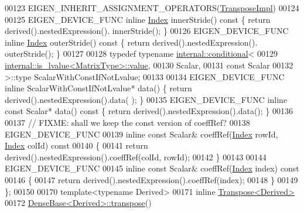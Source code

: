 \begin{DoxyCode}
00123     EIGEN\_INHERIT\_ASSIGNMENT\_OPERATORS(\hyperlink{class_eigen_1_1_transpose_impl}{TransposeImpl})
00124 
00125     EIGEN\_DEVICE\_FUNC \textcolor{keyword}{inline} \hyperlink{namespace_eigen_a62e77e0933482dafde8fe197d9a2cfde}{Index} innerStride()\textcolor{keyword}{ const }\{ \textcolor{keywordflow}{return} derived().nestedExpression().
      innerStride(); \}
00126     EIGEN\_DEVICE\_FUNC \textcolor{keyword}{inline} \hyperlink{namespace_eigen_a62e77e0933482dafde8fe197d9a2cfde}{Index} outerStride()\textcolor{keyword}{ const }\{ \textcolor{keywordflow}{return} derived().nestedExpression().
      outerStride(); \}
00127 
00128     \textcolor{keyword}{typedef} \textcolor{keyword}{typename} \hyperlink{struct_eigen_1_1internal_1_1conditional}{internal::conditional}<
00129                        \hyperlink{struct_eigen_1_1internal_1_1is__lvalue}{internal::is\_lvalue<MatrixType>::value},
00130                        Scalar,
00131                        \textcolor{keyword}{const} Scalar
00132                      >::type ScalarWithConstIfNotLvalue;
00133 
00134     EIGEN\_DEVICE\_FUNC \textcolor{keyword}{inline} ScalarWithConstIfNotLvalue* data() \{ \textcolor{keywordflow}{return} derived().nestedExpression().data(
      ); \}
00135     EIGEN\_DEVICE\_FUNC \textcolor{keyword}{inline} \textcolor{keyword}{const} Scalar* data()\textcolor{keyword}{ const }\{ \textcolor{keywordflow}{return} derived().nestedExpression().data(); \}
00136 
00137     \textcolor{comment}{// FIXME: shall we keep the const version of coeffRef?}
00138     EIGEN\_DEVICE\_FUNC
00139     \textcolor{keyword}{inline} \textcolor{keyword}{const} Scalar& coeffRef(\hyperlink{namespace_eigen_a62e77e0933482dafde8fe197d9a2cfde}{Index} rowId, \hyperlink{namespace_eigen_a62e77e0933482dafde8fe197d9a2cfde}{Index} colId)\textcolor{keyword}{ const}
00140 \textcolor{keyword}{    }\{
00141       \textcolor{keywordflow}{return} derived().nestedExpression().coeffRef(colId, rowId);
00142     \}
00143 
00144     EIGEN\_DEVICE\_FUNC
00145     \textcolor{keyword}{inline} \textcolor{keyword}{const} Scalar& coeffRef(\hyperlink{namespace_eigen_a62e77e0933482dafde8fe197d9a2cfde}{Index} index)\textcolor{keyword}{ const}
00146 \textcolor{keyword}{    }\{
00147       \textcolor{keywordflow}{return} derived().nestedExpression().coeffRef(index);
00148     \}
00149 \};
00150 
00170 \textcolor{keyword}{template}<\textcolor{keyword}{typename} Derived>
00171 \textcolor{keyword}{inline} \hyperlink{group___core___module_class_eigen_1_1_transpose}{Transpose<Derived>}
00172 \hyperlink{group___core___module_ac8952c19644a4ac7e41bea45c19b909c}{DenseBase<Derived>::transpose}()

\end{DoxyCode}
